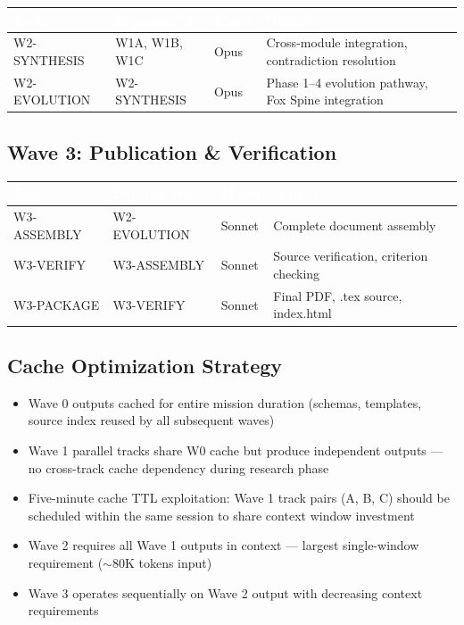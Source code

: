 \documentclass[11pt,letterpaper]{article}
\newcommand{\tableheader}[1]{\textbf{\sffamily\textcolor{white}{#1}}}
\begin{document}
\begin{center}
\begin{tabularx}{\textwidth}{L{3cm}L{3cm}C{1.5cm}X}
\toprule
{}
\tableheader{Task} & \tableheader{Depends On} & \tableheader{Model} & \tableheader{Output} \\
\midrule
W2-SYNTHESIS & W1A, W1B, W1C & Opus & Cross-module integration, contradiction resolution \\
W2-EVOLUTION & W2-SYNTHESIS & Opus & Phase 1--4 evolution pathway, Fox Spine integration \\
\bottomrule
\end{tabularx}
\end{center}

\subsection{Wave 3: Publication \& Verification}

\begin{center}
\begin{tabularx}{\textwidth}{L{3cm}L{3cm}C{1.5cm}X}
\toprule
{}
\tableheader{Task} & \tableheader{Depends On} & \tableheader{Model} & \tableheader{Output} \\
\midrule
W3-ASSEMBLY & W2-EVOLUTION & Sonnet & Complete document assembly \\
W3-VERIFY & W3-ASSEMBLY & Sonnet & Source verification, criterion checking \\
W3-PACKAGE & W3-VERIFY & Sonnet & Final PDF, .tex source, index.html \\
\bottomrule
\end{tabularx}
\end{center}

\subsection{Cache Optimization Strategy}

\begin{itemize}[leftmargin=2em]
  \item Wave 0 outputs cached for entire mission duration (schemas, templates, source index reused by all subsequent waves)
  \item Wave 1 parallel tracks share W0 cache but produce independent outputs --- no cross-track cache dependency during research phase
  \item Five-minute cache TTL exploitation: Wave 1 track pairs (A, B, C) should be scheduled within the same session to share context window investment
  \item Wave 2 requires all Wave 1 outputs in context --- largest single-window requirement (${\sim}80$K tokens input)
  \item Wave 3 operates sequentially on Wave 2 output with decreasing context requirements
\end{itemize}
\end{document}
